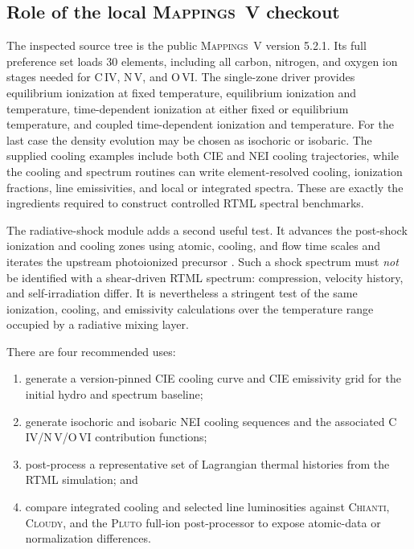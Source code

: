 \documentclass[english,a4paper]{my_memo2}
\begin{document}
\subsection{Role of the local \textsc{Mappings~V} checkout}
\label{sec:mappings}

The inspected source tree is the public \textsc{Mappings~V} version 5.2.1.
Its full preference set loads 30 elements, including all carbon, nitrogen,
and oxygen ion stages needed for C\,IV, N\,V, and O\,VI.  The single-zone
driver provides equilibrium ionization at fixed temperature, equilibrium
ionization and temperature, time-dependent ionization at either fixed or
equilibrium temperature, and coupled time-dependent ionization and
temperature.  For the last case the density evolution may be chosen as
isochoric or isobaric.  The supplied cooling examples include both CIE and
NEI cooling trajectories, while the cooling and spectrum routines can write
element-resolved cooling, ionization fractions, line emissivities, and local
or integrated spectra.  These are exactly the ingredients required to
construct controlled RTML spectral benchmarks.

The radiative-shock module adds a second useful test.  It advances the
post-shock ionization and cooling zones using atomic, cooling, and flow time
scales and iterates the upstream photoionized precursor
\cite{Sutherland2017}.  Such a shock spectrum must \emph{not} be identified
with a shear-driven RTML spectrum: compression, velocity history, and
self-irradiation differ.  It is nevertheless a stringent test of the same
ionization, cooling, and emissivity calculations over the temperature range
occupied by a radiative mixing layer.

There are four recommended uses:
\begin{enumerate}[leftmargin=*]
\item generate a version-pinned CIE cooling curve and CIE emissivity grid for
the initial hydro and spectrum baseline;
\item generate isochoric and isobaric NEI cooling sequences and the associated
C\,IV/N\,V/O\,VI contribution functions;
\item post-process a representative set of Lagrangian thermal histories from
the RTML simulation; and
\item compare integrated cooling and selected line luminosities against
\textsc{Chianti}, \textsc{Cloudy}, and the \textsc{Pluto} full-ion
post-processor to expose atomic-data or normalization differences.
\end{enumerate}
\end{document}
